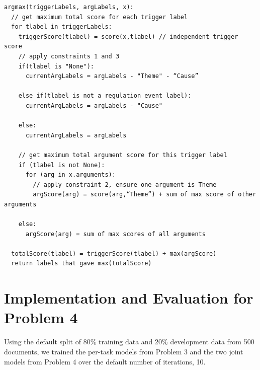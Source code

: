 \documentclass{article} %
\begin{document}
\begin{verbatim}
argmax(triggerLabels, argLabels, x):
  // get maximum total score for each trigger label
  for tlabel in triggerLabels:
    triggerScore(tlabel) = score(x,tlabel) // independent trigger score
    // apply constraints 1 and 3
    if(tlabel is "None"):
      currentArgLabels = argLabels - "Theme" - “Cause”
    
    else if(tlabel is not a regulation event label):
      currentArgLabels = argLabels - "Cause"
      
    else:
      currentArgLabels = argLabels
      
    // get maximum total argument score for this trigger label
    if (tlabel is not None):
      for (arg in x.arguments):
        // apply constraint 2, ensure one argument is Theme
        argScore(arg) = score(arg,“Theme”) + sum of max score of other arguments
        
    else:
      argScore(arg) = sum of max scores of all arguments
      
  totalScore(tlabel) = triggerScore(tlabel) + max(argScore)
  return labels that gave max(totalScore)
\end{verbatim}

\section{Implementation and Evaluation for Problem 4}

Using the default split of 80\% training data and 20\% development data from 500 documents, we trained the per-task models from Problem 3 and the two joint models from Problem 4 over the default number of iterations, 10.
\end{document}
